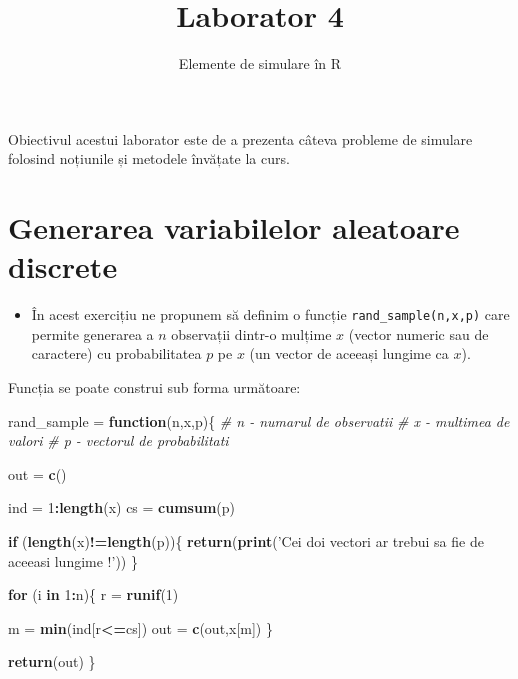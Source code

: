 \documentclass[]{article}
\title{Laborator 4}
\subtitle{Elemente de simulare în R}
\author{}
\date{}
\newenvironment{Shaded}{\begin{snugshade}}{\end{snugshade}}
\newcommand{\KeywordTok}[1]{\textcolor[rgb]{0.13,0.29,0.53}{\textbf{#1}}}
\newcommand{\DecValTok}[1]{\textcolor[rgb]{0.00,0.00,0.81}{#1}}
\newcommand{\StringTok}[1]{\textcolor[rgb]{0.31,0.60,0.02}{#1}}
\newcommand{\CommentTok}[1]{\textcolor[rgb]{0.56,0.35,0.01}{\textit{#1}}}
\newcommand{\ControlFlowTok}[1]{\textcolor[rgb]{0.13,0.29,0.53}{\textbf{#1}}}
\newcommand{\OperatorTok}[1]{\textcolor[rgb]{0.81,0.36,0.00}{\textbf{#1}}}
\newcommand{\NormalTok}[1]{#1}
\newenvironment{frshaded*}{%
  \def\FrameCommand{\fboxrule=\FrameRule\fboxsep=\FrameSep \fcolorbox{framecolor}{shadecolor1}}%
  \MakeFramed {\advance\hsize-\width \FrameRestore}}%
{\endMakeFramed}
\newenvironment{rmdblock}[1]
  {\begin{frshaded*}
  \begin{itemize}
  \renewcommand{\labelitemi}{
    \raisebox{-.7\height}[0pt][0pt]{
      {\setkeys{Gin}{width=2em,keepaspectratio}\texttt{[image: images/icons/\#1]}}
    }
  }
  \item
  }
  {
  \end{itemize}
  \end{frshaded*}
  }
\newenvironment{rmdexercise}
  {\begin{rmdblock}{exercise}}
  {\end{rmdblock}}
\begin{document}
\maketitle

\thispagestyle{fancy}

Obiectivul acestui laborator este de a prezenta câteva probleme de
simulare folosind noțiunile și metodele învățate la curs.

\section{Generarea variabilelor aleatoare
discrete}\label{generarea-variabilelor-aleatoare-discrete}

\begin{rmdexercise}
În acest exercițiu ne propunem să definim o funcție
\texttt{rand\_sample(n,x,p)} care permite generarea a \(n\) observații
dintr-o mulțime \(x\) (vector numeric sau de caractere) cu
probabilitatea \(p\) pe \(x\) (un vector de aceeași lungime ca \(x\)).
\end{rmdexercise}

Funcția se poate construi sub forma următoare:

\begin{Shaded}
\begin{Highlighting}[]
\NormalTok{rand_sample =}\StringTok{ }\ControlFlowTok{function}\NormalTok{(n,x,p)\{}
  \CommentTok{# n - numarul de observatii}
  \CommentTok{# x - multimea de valori}
  \CommentTok{# p - vectorul de probabilitati}
  
\NormalTok{  out =}\StringTok{ }\KeywordTok{c}\NormalTok{()}
  
\NormalTok{  ind =}\StringTok{ }\DecValTok{1}\OperatorTok{:}\KeywordTok{length}\NormalTok{(x)}
\NormalTok{  cs =}\StringTok{ }\KeywordTok{cumsum}\NormalTok{(p) }
  
  \ControlFlowTok{if}\NormalTok{ (}\KeywordTok{length}\NormalTok{(x)}\OperatorTok{!=}\KeywordTok{length}\NormalTok{(p))\{}
    \KeywordTok{return}\NormalTok{(}\KeywordTok{print}\NormalTok{(}\StringTok{'Cei doi vectori ar trebui sa fie de aceeasi lungime !'}\NormalTok{))}
\NormalTok{  \}}
  
  \ControlFlowTok{for}\NormalTok{ (i }\ControlFlowTok{in} \DecValTok{1}\OperatorTok{:}\NormalTok{n)\{}
\NormalTok{    r =}\StringTok{ }\KeywordTok{runif}\NormalTok{(}\DecValTok{1}\NormalTok{)}
    
\NormalTok{    m =}\StringTok{ }\KeywordTok{min}\NormalTok{(ind[r}\OperatorTok{<=}\NormalTok{cs])}
\NormalTok{    out =}\StringTok{ }\KeywordTok{c}\NormalTok{(out,x[m])}
\NormalTok{  \}}
  
  \KeywordTok{return}\NormalTok{(out)}
\NormalTok{\}}
\end{Highlighting}
\end{Shaded}
\end{document}
